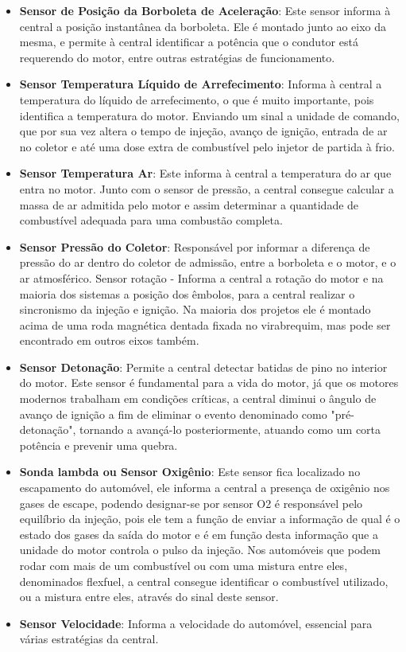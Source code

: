 \begin{itemize}
	\item \textbf{Sensor de Posição da Borboleta de Aceleração}: Este sensor informa à central a posição instantânea da borboleta. Ele é montado junto ao eixo da mesma, e permite à central identificar a potência que o condutor está requerendo do motor, entre outras estratégias de funcionamento.
	\item \textbf{Sensor Temperatura Líquido de Arrefecimento}: Informa à central a temperatura do líquido de arrefecimento, o que é muito importante, pois identifica a temperatura do motor. Enviando um sinal a unidade de comando, que por sua vez altera o tempo de injeção, avanço de ignição, entrada de ar no coletor e até uma dose extra de combustível pelo injetor de partida à frio.
	\item \textbf{Sensor Temperatura Ar}: Este informa à central a temperatura do ar que entra no motor. Junto com o sensor de pressão, a central consegue calcular a massa de ar admitida pelo motor e assim determinar a quantidade de combustível adequada para uma combustão completa.
	\item \textbf{Sensor Pressão do Coletor}: Responsável por informar a diferença de pressão do ar dentro do coletor de admissão, entre a borboleta e o motor, e o ar atmosférico.
Sensor rotação - Informa a central a rotação do motor e na maioria dos sistemas a posição dos êmbolos, para a central realizar o sincronismo da injeção e ignição. Na maioria dos projetos ele é montado acima de uma roda magnética dentada fixada no virabrequim, mas pode ser encontrado em outros eixos também.
	\item \textbf{Sensor Detonação}: Permite a central detectar batidas de pino no interior do motor. Este sensor é fundamental para a vida do motor, já que os motores modernos trabalham em condições críticas, a central diminui o ângulo de avanço de ignição a fim de eliminar o evento denominado como "pré-detonação", tornando a avançá-lo posteriormente, atuando como um corta potência e prevenir uma quebra.
	\item \textbf{Sonda lambda ou Sensor Oxigênio}: Este sensor fica localizado no escapamento do automóvel, ele informa a central a presença de oxigênio nos gases de escape, podendo designar-se por sensor O2 é responsável pelo equilíbrio da injeção, pois ele tem a função de enviar a informação de qual é o estado dos gases da saída do motor e é em função desta informação que a unidade do motor controla o pulso da injeção. Nos automóveis que podem rodar com mais de um combustível ou com uma mistura entre eles, denominados flexfuel, a central consegue identificar o combustível utilizado, ou a mistura entre eles, através do sinal deste sensor.
	\item \textbf{Sensor Velocidade}: Informa a velocidade do automóvel, essencial para várias estratégias da central.
\end{itemize}
	
